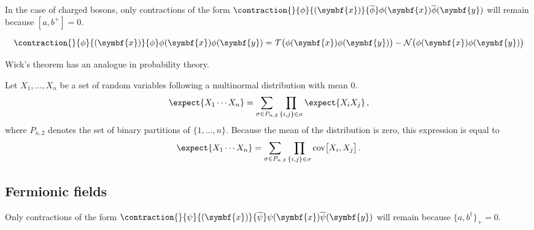     \begin{remark}
        In the case of charged bosons, only contractions of the form $\contraction{}{\phi}{(\symbf{x})}{\overline\phi}\phi(\symbf{x})\overline\phi(\symbf{y})$ will remain because $[a,b^+]=0$.
    \end{remark}

    \begin{result}
        \begin{gather}
            \contraction{}{\phi}{(\symbf{x})}{\phi}\phi(\symbf{x})\phi(\symbf{y}) = \mathcal{T}\bigl(\phi(\symbf{x})\phi(\symbf{y})\bigr) - \mathcal{N}\bigl(\phi(\symbf{x})\phi(\symbf{y})\bigr)
        \end{gather}
    \end{result}

    Wick's theorem has an analogue in probability theory.
    \begin{theorem}[Isserlis]\label{qft:isserlis}
        Let $X_1,\ldots,X_n$ be a set of random variables following a multinormal distribution with mean 0.
        \begin{gather}
            \expect{X_1\cdots X_n} = \sum_{\sigma\in P_{n,2}}\prod_{\{i,j\}\in\sigma}\expect{X_iX_j}\,,
        \end{gather}
        where $P_{n,2}$ denotes the set of binary partitions of $\{1,\ldots,n\}$. Because the mean of the distribution is zero, this expression is equal to
        \begin{gather}
            \expect{X_1\cdots X_n} = \sum_{\sigma\in P_{n,2}}\prod_{\{i,j\}\in\sigma}\mathrm{cov}\bigl[X_i,X_j\bigr]\,.
        \end{gather}
    \end{theorem}

\subsection{Fermionic fields}

    \begin{remark}
        Only contractions of the form $\contraction{}{\psi}{(\symbf{x})}{\overline\psi}\psi(\symbf{x})\overline\psi(\symbf{y})$ will remain because $\{a,b^\dag\}_+=0$.
    \end{remark}


